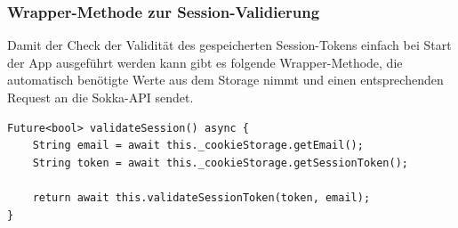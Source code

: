 \subsubsection{Wrapper-Methode zur Session-Validierung}

Damit der Check der Validität des gespeicherten Session-Tokens einfach
bei Start der App ausgeführt werden kann gibt es folgende Wrapper-Methode,
die automatisch benötigte Werte aus dem Storage nimmt und einen entsprechenden
Request an die Sokka-API sendet.

\begin{lstlisting}
Future<bool> validateSession() async {
    String email = await this._cookieStorage.getEmail();
    String token = await this._cookieStorage.getSessionToken();

    return await this.validateSessionToken(token, email);
}
\end{lstlisting}